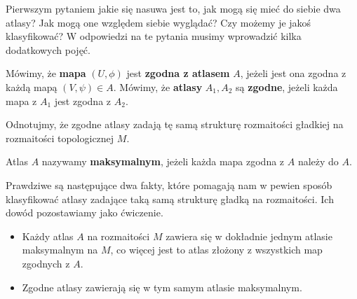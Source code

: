 Pierwszym pytaniem jakie się nasuwa jest to, jak mogą się mieć do siebie dwa atlasy? Jak mogą one względem siebie wyglądać? Czy możemy je jakoś klasyfikować? W odpowiedzi na te pytania musimy wprowadzić kilka dodatkowych pojęć.

\begin{definition}
	Mówimy, że \textbf{mapa} $(U, \phi)$ jest \textbf{zgodna z atlasem} $A$, jeżeli jest ona zgodna z każdą mapą $(V,\psi) \in A$. Mówimy, że \textbf{atlasy} $A_1, A_2$ są \textbf{zgodne}, jeżeli każda mapa z $A_1$ jest zgodna z $A_2$.
\end{definition}
Odnotujmy, że zgodne atlasy zadają tę samą strukturę rozmaitości gładkiej na rozmaitości topologicznej $M$.

\begin{definition}
	Atlas $A$ nazywamy \textbf{maksymalnym}, jeżeli każda mapa zgodna z $A$ należy do $A$.
\end{definition}

Prawdziwe są następujące dwa fakty, które pomagają nam w pewien sposób klasyfikować atlasy zadające taką samą strukturę gładką na rozmaitości. Ich dowód pozostawiamy jako ćwiczenie.
\begin{itemize}
	\item Każdy atlas $A$ na rozmaitości $M$ zawiera się w dokładnie jednym atlasie maksymalnym na $M$, co więcej jest to atlas złożony z wszystkich map zgodnych z $A$.
	\item Zgodne atlasy zawierają się w tym samym atlasie maksymalnym.
\end{itemize}


